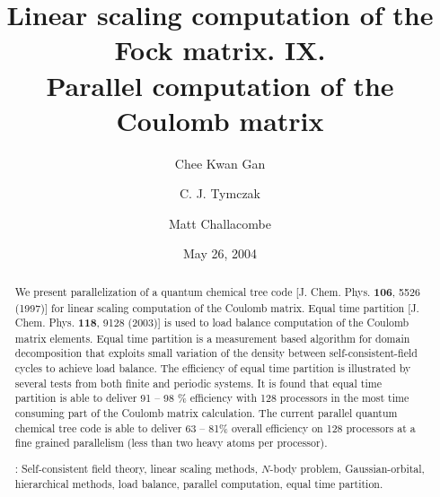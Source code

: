 \commentoutA{\documentclass[prl,aps,twocolumn,twocolumngrid,superbib]{revtex4}}
\begin{document}
\title[Short Title]{
Linear scaling computation of the Fock matrix. IX. \\
Parallel computation of the Coulomb matrix\footnotemark[1]}

\author{Chee Kwan Gan\footnotemark[2]}
\author{C. J. Tymczak\footnotemark[3]}
\author{Matt Challacombe\footnotemark[4]}


\date{May 26, 2004}

\begin{abstract}
We present parallelization of a quantum chemical tree code
[J. Chem. Phys. {\bf 106}, 5526 (1997)] for linear scaling computation
of the Coulomb matrix.  Equal time partition [J. Chem. Phys. {\bf
118}, 9128 (2003)] is used to load balance computation of the Coulomb
matrix elements.  Equal time partition is a measurement based
algorithm for domain decomposition that exploits small variation of
the density between self-consistent-field cycles to achieve load
balance. The efficiency of equal time partition is illustrated by
several tests from both finite and periodic systems.  It is found that
equal time partition is able to deliver 91 -- 98 \% efficiency with
128 processors in the most time consuming part of the
Coulomb matrix calculation.  The current parallel quantum chemical
tree code is able to deliver 63 -- 81\% overall efficiency on 128
processors at a fine grained parallelism (less than two heavy atoms
per processor).


\smallskip
{}:
Self-consistent field theory, linear scaling methods, $N$-body problem,
Gaussian-orbital, hierarchical methods, load balance, parallel computation,
equal time partition.
\end{abstract}
\maketitle
\end{document}
